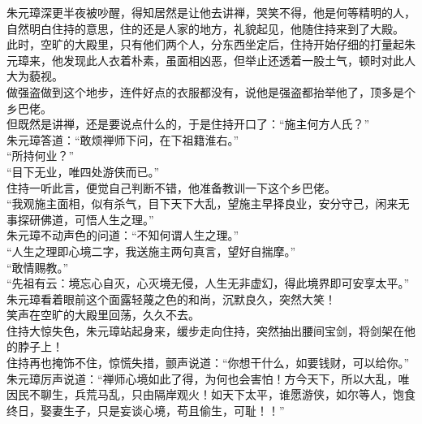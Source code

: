 \begin{multicols}{\theparacolNo}
朱元璋深更半夜被吵醒，得知居然是让他去讲禅，哭笑不得，他是何等精明的人，自然明白住持的意思，住的还是人家的地方，礼貌起见，他随住持来到了大殿。\\

此时，空旷的大殿里，只有他们两个人，分东西坐定后，住持开始仔细的打量起朱元璋来，他发现此人衣着朴素，虽面相凶恶，但举止还透着一股土气，顿时对此人大为藐视。\\

做强盗做到这个地步，连件好点的衣服都没有，说他是强盗都抬举他了，顶多是个乡巴佬。\\

但既然是讲禅，还是要说点什么的，于是住持开口了：“施主何方人氏？”\\

朱元璋答道：“敢烦禅师下问，在下祖籍淮右。”\\

“所持何业？”\\

“目下无业，唯四处游侠而已。”\\

住持一听此言，便觉自己判断不错，他准备教训一下这个乡巴佬。\\

“我观施主面相，似有杀气，目下天下大乱，望施主早择良业，安分守己，闲来无事探研佛道，可悟人生之理。”\\

朱元璋不动声色的问道：“不知何谓人生之理。”\\

“人生之理即心境二字，我送施主两句真言，望好自揣摩。”\\

“敢情赐教。”\\

“先祖有云：境忘心自灭，心灭境无侵，人生无非虚幻，得此境界即可安享太平。”\\

朱元璋看着眼前这个面露轻蔑之色的和尚，沉默良久，突然大笑！\\

笑声在空旷的大殿里回荡，久久不去。\\

住持大惊失色，朱元璋站起身来，缓步走向住持，突然抽出腰间宝剑，将剑架在他的脖子上！\\

住持再也掩饰不住，惊慌失措，颤声说道：“你想干什么，如要钱财，可以给你。”\\

朱元璋厉声说道：“禅师心境如此了得，为何也会害怕！方今天下，所以大乱，唯因民不聊生，兵荒马乱，只由隔岸观火！如天下太平，谁愿游侠，如尔等人，饱食终日，娶妻生子，只是妄谈心境，苟且偷生，可耻！！”\\


\end{multicols}
